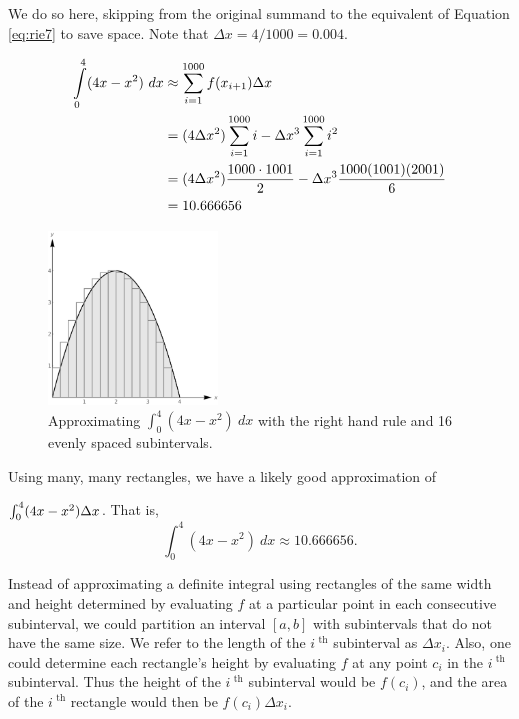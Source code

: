 \begin{example}
We do so here, skipping from the original summand to the equivalent of Equation \eqref{eq:rie7} to save space. Note that $\Delta x = 4/1000 = 0.004$.

\begin{align}
\displaystyle\int\limits_0^4 (4x-x^2)\ dx &\approx \sum_{i=1}^{1000} f(x_{i+1})\Delta x \notag\\
									&= (4\Delta x^2)\sum_{i=1}^{1000} i - \Delta x^3 \sum_{i=1}^{1000} i^2 \notag\\
									&= (4\Delta x^2)\frac{1000\cdot 1001}{2} - \Delta x^3 \frac{1000(1001)(2001)}6 \notag\\
									&=10.666656 \notag
\end{align}


\begin{figure}[H]
	\begin{center}
			\includegraphics[width=0.4\textwidth]{fig_int_5}
	\caption{Approximating $\int_0^4(4x-x^2)\ dx$ with the right hand rule and 16 evenly spaced subintervals.}
	\label{fig_int_5}
	\end{center}
\end{figure}


Using many, many rectangles, we have a likely good approximation of 

$\int_0^4 (4x-x^2)\Delta x$. That is, $$\int_0^4(4x-x^2)\ dx \approx 10.666656.$$
\end{example}

Instead of approximating a definite integral using rectangles of the same width and height determined by evaluating $f$ at a particular point in each consecutive subinterval, we could partition an interval $[a,b]$ with subintervals that do not have the same size. We refer to the length of the $i^\text{ th}$ subinterval as $\Delta x_i$. Also, one could determine each rectangle's height by evaluating $f$ at any point $c_i$ in the $i^\text{ th}$ subinterval. Thus the height of the $i^\text{ th}$ subinterval would be $f(c_i)$, and the area of the $i^\text{ th}$ rectangle would then be $f(c_i)\Delta x_i$.

